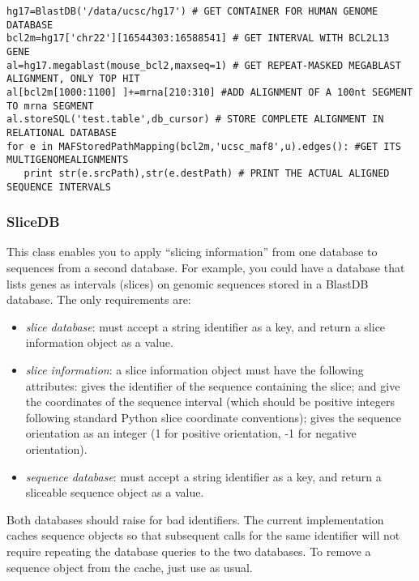 \documentclass{howto}
\begin{document}
\begin{verbatim}
hg17=BlastDB('/data/ucsc/hg17') # GET CONTAINER FOR HUMAN GENOME DATABASE
bcl2m=hg17['chr22'][16544303:16588541] # GET INTERVAL WITH BCL2L13 GENE
al=hg17.megablast(mouse_bcl2,maxseq=1) # GET REPEAT-MASKED MEGABLAST ALIGNMENT, ONLY TOP HIT
al[bcl2m[1000:1100] ]+=mrna[210:310] #ADD ALIGNMENT OF A 100nt SEGMENT TO mrna SEGMENT
al.storeSQL('test.table',db_cursor) # STORE COMPLETE ALIGNMENT IN RELATIONAL DATABASE
for e in MAFStoredPathMapping(bcl2m,'ucsc_maf8',u).edges(): #GET ITS MULTIGENOMEALIGNMENTS
   print str(e.srcPath),str(e.destPath) # PRINT THE ACTUAL ALIGNED SEQUENCE INTERVALS
\end{verbatim}


\subsubsection{SliceDB}
This class enables you to apply ``slicing information'' from 
one database to sequences from a second database.  For example,
you could have a database that lists genes as intervals (slices)
on genomic sequences stored in a BlastDB database.  The only
requirements are:
\begin{itemize}
\item
{\em slice database}: must accept a string identifier as a key,
and return a slice information object as a value.

\item
{\em slice information}: a slice information object must
have the following attributes:  gives the identifier
of the sequence containing the slice;  and 
give the coordinates of the sequence interval (which should be positive
integers following standard
Python slice coordinate conventions);  gives the sequence
orientation as an integer (1 for positive orientation, -1 for
negative orientation).

\item
{\em sequence database}: must accept a string identifier as a key,
and return a sliceable sequence object as a value.

\end{itemize}

Both databases should raise  for bad identifiers.
The current  implementation caches sequence objects so
that subsequent calls for the same identifier will not require
repeating the database queries to the two databases.  To
remove a sequence object from the cache, just use
 as usual.
\end{document}
